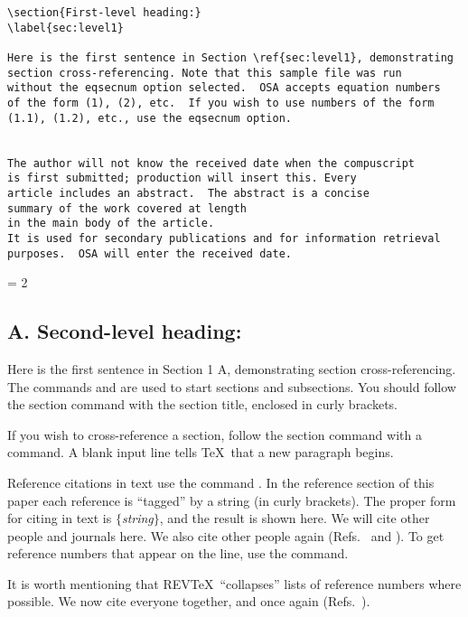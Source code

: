 \begin{verbatim}
\section{First-level heading:}
\label{sec:level1}

Here is the first sentence in Section \ref{sec:level1}, demonstrating
section cross-referencing. Note that this sample file was run
without the eqsecnum option selected.  OSA accepts equation numbers
of the form (1), (2), etc.  If you wish to use numbers of the form
(1.1), (1.2), etc., use the eqsecnum option.


The author will not know the received date when the compuscript
is first submitted; production will insert this. Every
article includes an abstract.  The abstract is a concise
summary of the work covered at length
in the main body of the article.
It is used for secondary publications and for information retrieval
purposes.  OSA will enter the received date.

\end{verbatim} \newpage
\baselineskip = 2\baselineskip  %

\subsection*{A. Second-level heading:}
\label{sec:level2}

Here is the first sentence in Section 1 A, demonstrating
section cross-referencing.
The commands  and  are used to start
sections and subsections. You should follow the section command with
the section title, enclosed in curly brackets.

If you wish to cross-reference a section,
follow the section command with a 
command. A blank input line tells \TeX\ that a new paragraph begins.

Reference citations in text use the command .
In the reference section of this paper
each reference is ``tagged'' by a string (in curly brackets).
The proper form for citing in text is
$\{${\it string}$\}$,
and the result is shown here.\cite{smith82,jones78}
We will cite  other people \cite{smith82,jonessmith80}
and journals here. We also cite other people again (Refs.\
 and ).  To get
reference numbers that appear on the line, use the 
command.

It is worth mentioning that  REV\TeX\ ``collapses'' lists
of reference numbers where possible.  We now cite
everyone together, \cite{smith82,jones78,jonessmith80} and once again
(Refs.\ \onlinecite{smith82,jones78,jonessmith80}).

